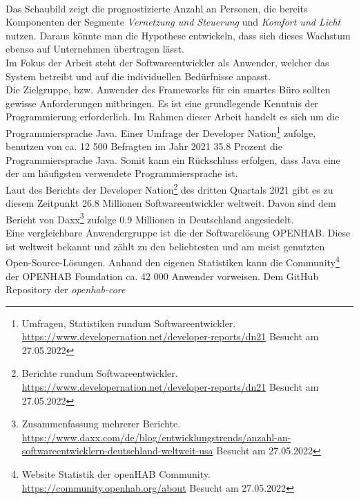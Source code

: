        \\
        Das Schaubild zeigt die prognostizierte Anzahl an Personen, die bereits Komponenten der Segmente 
        \textit{Vernetzung und Steuerung} und \textit{Komfort und Licht} nutzen. Daraus könnte man die Hypothese entwickeln, dass sich dieses Wachstum 
        ebenso auf Unternehmen übertragen lässt. 
        \\
        \linebreak
        Im Fokus der Arbeit steht der Softwareentwickler als Anwender, welcher das System betreibt und auf die 
        individuellen Bedürfnisse anpasst. 
        \\
        Die Zielgruppe, bzw. Anwender des Frameworks für ein smartes Büro sollten gewisse Anforderungen mitbringen.
        Es ist eine grundlegende Kenntnis der Programmierung erforderlich. Im Rahmen dieser Arbeit handelt es sich 
        um die Programmiersprache Java. Einer Umfrage der Developer Nation\footnote{Umfragen, Statistiken rundum Softwareentwickler. \url{https://www.developernation.net/developer-reports/dn21} Besucht am 27.05.2022} 
        zufolge, benutzen von ca. 12 500 Befragten im Jahr 2021 35.8 Prozent die Programmiersprache Java. Somit kann 
        ein Rückschluss erfolgen, dass Java eine der am häufigsten verwendete Programmiersprache ist.
        \\
        \linebreak
        Laut des Berichts der Developer Nation\footnote{Berichte rundum Softwareentwickler. \url{https://www.developernation.net/developer-reports/dn21} Besucht am 27.05.2022}
        des dritten Quartals 2021 gibt es zu diesem Zeitpunkt 26.8 Millionen Softwareentwickler weltweit. Davon sind dem 
        Bericht von Daxx\footnote{Zusammenfassung mehrerer Berichte. \url{https://www.daxx.com/de/blog/entwicklungstrends/anzahl-an-softwareentwicklern-deutschland-weltweit-usa} Besucht am 27.05.2022}
        zufolge 0.9 Millionen in Deutschland angesiedelt. 
        \\
        \linebreak
        Eine vergleichbare Anwendergruppe ist die der Softwarelösung \acs{OPENHAB}. Diese ist weltweit bekannt und zählt zu den 
        beliebtesten und am meist genutzten Open-Source-Lösungen. Anhand den eigenen Statistiken kann die Community\footnote{Website Statistik der openHAB Community. \url{https://community.openhab.org/about} Besucht am 27.05.2022} 
        der \acs{OPENHAB} Foundation ca. 42 000 Anwender vorweisen. Dem GitHub Repository der \textit{openhab-core} 
